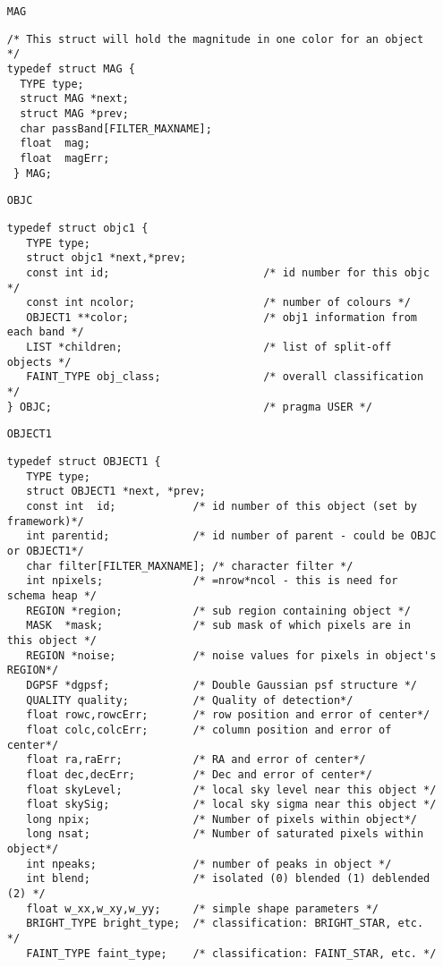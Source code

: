{\begin{itemize}
\item[{\tt MAG}]

\begin{verbatim}
/* This struct will hold the magnitude in one color for an object */
typedef struct MAG {
  TYPE type;
  struct MAG *next;
  struct MAG *prev;
  char passBand[FILTER_MAXNAME];
  float  mag;
  float  magErr;
 } MAG;
\end{verbatim}

\item[{\tt OBJC}]

\begin{verbatim}
typedef struct objc1 {
   TYPE type;
   struct objc1 *next,*prev;
   const int id;                        /* id number for this objc */
   const int ncolor;                    /* number of colours */
   OBJECT1 **color;                     /* obj1 information from each band */
   LIST *children;                      /* list of split-off objects */
   FAINT_TYPE obj_class;                /* overall classification */
} OBJC;                                 /* pragma USER */
\end{verbatim}

\item[{\tt OBJECT1}]

\begin{verbatim}
typedef struct OBJECT1 {
   TYPE type;
   struct OBJECT1 *next, *prev;
   const int  id;            /* id number of this object (set by framework)*/
   int parentid;             /* id number of parent - could be OBJC or OBJECT1*/
   char filter[FILTER_MAXNAME]; /* character filter */
   int npixels;              /* =nrow*ncol - this is need for schema heap */
   REGION *region;           /* sub region containing object */
   MASK  *mask;              /* sub mask of which pixels are in this object */
   REGION *noise;            /* noise values for pixels in object's REGION*/
   DGPSF *dgpsf;             /* Double Gaussian psf structure */
   QUALITY quality;          /* Quality of detection*/
   float rowc,rowcErr;       /* row position and error of center*/
   float colc,colcErr;       /* column position and error of center*/
   float ra,raErr;           /* RA and error of center*/
   float dec,decErr;         /* Dec and error of center*/
   float skyLevel;           /* local sky level near this object */
   float skySig;             /* local sky sigma near this object */
   long npix;                /* Number of pixels within object*/
   long nsat;                /* Number of saturated pixels within object*/
   int npeaks;               /* number of peaks in object */
   int blend;                /* isolated (0) blended (1) deblended (2) */
   float w_xx,w_xy,w_yy;     /* simple shape parameters */
   BRIGHT_TYPE bright_type;  /* classification: BRIGHT_STAR, etc. */
   FAINT_TYPE faint_type;    /* classification: FAINT_STAR, etc. */


\end{verbatim}
\end{itemize}}

